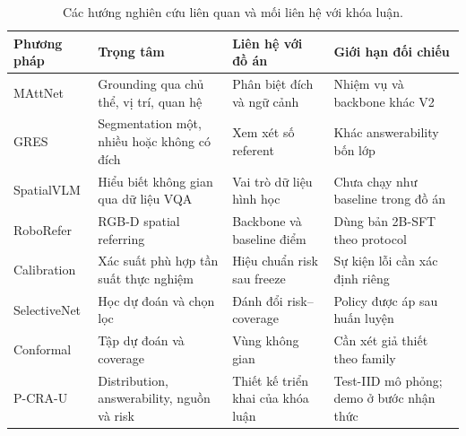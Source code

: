 \begin{table}[htbp]
    \centering
    \setlength{\tabcolsep}{4pt}
    \renewcommand{\arraystretch}{1.15}
    \caption{Các hướng nghiên cứu liên quan và mối liên hệ với khóa luận.}
    \label{tab:theory-related-work}
    \begingroup
    \footnotesize
    \renewcommand{\arraystretch}{1.2}
    \begin{tabularx}{\textwidth}{@{}>{\raggedright\arraybackslash}p{}>{\raggedright\arraybackslash}p{}>{\raggedright\arraybackslash}p{}>{\raggedright\arraybackslash}p{}@{}}
        \toprule
        \textbf{Phương pháp} & \textbf{Trọng tâm} &
        \textbf{Liên hệ với đồ án} & \textbf{Giới hạn đối chiếu} \\
        \midrule
        MAttNet \cite{yu2018mattnet} &
        Grounding qua chủ thể, vị trí, quan hệ &
        Phân biệt đích và ngữ cảnh &
        Nhiệm vụ và backbone khác V2 \\
        GRES \cite{liu2023gres} &
        Segmentation một, nhiều hoặc không có đích &
        Xem xét số referent &
        Khác answerability bốn lớp \\
        SpatialVLM \cite{chen2024spatialvlm} &
        Hiểu biết không gian qua dữ liệu VQA &
        Vai trò dữ liệu hình học &
        Chưa chạy như baseline trong đồ án \\
        RoboRefer \cite{zhou2025roborefer} &
        RGB-D spatial referring &
        Backbone và baseline điểm &
        Dùng bản 2B-SFT theo protocol \\
        Calibration \cite{guo2017calibration} &
        Xác suất phù hợp tần suất thực nghiệm &
        Hiệu chuẩn risk sau freeze &
        Sự kiện lỗi cần xác định riêng \\
        SelectiveNet \cite{geifman2019selectivenet} &
        Học dự đoán và chọn lọc &
        Đánh đổi risk--coverage &
        Policy được áp sau huấn luyện \\
        Conformal \cite{angelopoulos2021conformal} &
        Tập dự đoán và coverage &
        Vùng không gian &
        Cần xét giả thiết theo family \\
        P-CRA-U &
        Distribution, answerability, nguồn và risk &
        Thiết kế triển khai của khóa luận &
        Test-IID mô phỏng; demo ở bước nhận thức \\
        \bottomrule
    \end{tabularx}
    \endgroup
\end{table}

